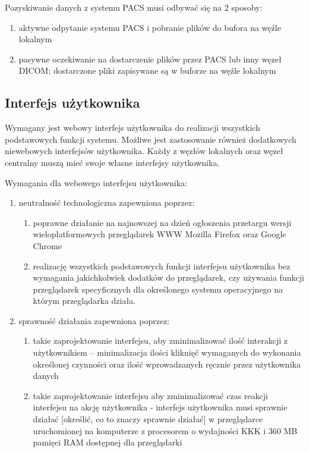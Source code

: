 \documentclass[a4paper]{article}
\begin{document}
Pozyskiwanie danych z systemu PACS musi odbywać się na 2 sposoby:
\begin{enumerate}
  \item aktywne odpytanie systemu PACS i pobranie plików do bufora na węźle lokalnym
  \item pasywne oczekiwanie na dostarczenie plików przez PACS lub inny węzeł DICOM; dostarczone pliki zapisywane są w buforze na węźle lokalnym
\end{enumerate}

\subsection{Interfejs użytkownika}

Wymagany jest webowy interfejs użytkownika do realizacji wszystkich podstawowych funkcji systemu. Możliwe jest zastosowanie również dodatkowych niewebowych interfejsów użytkownika. Każdy z węzłów lokalnych oraz węzeł centralny muszą mieć swoje własne interfejsy użytkownika.

Wymagania dla webowego interfejsu użytkownika:

\begin{enumerate}
    \item neutralność technologiczna zapewniona poprzez:
	  \begin{enumerate}
	  \item poprawne działanie na najnowszej na dzień ogłoszenia przetargu wersji wieloplatformowych przeglądarek WWW Mozilla Firefox oraz Google Chrome
	  \item realizację wszystkich podstawowych funkcji interfejsu użytkownika bez wymagania jakichkolwiek dodatków do przeglądarek, czy używania funkcji przeglądarek specyficznych dla określonego systemu operacyjnego na którym przeglądarka działa.
	  \end{enumerate}
    \item sprawność działania zapewniona poprzez:
	  \begin{enumerate}
	  \item takie zaprojektowanie interfejsu, aby zminimalizować ilość interakcji z użytkownikiem -- minimalizacja ilości kliknięć wymaganych do wykonania określonej czynności oraz ilość wprowadzanych ręcznie przez użytkownika danych
	  \item takie zaprojektowanie interfejsu aby zminimalizować czas reakcji interfejsu na akcję użytkownika - interfejs użytkownika musi sprawnie działać [określić, co to znaczy sprawnie działać] w przeglądarce uruchomionej na komputerze z procesorem o wydajności KKK i 360 MB pamięci RAM dostępnej dla przeglądarki
	  \end{enumerate}
\end{enumerate}
\end{document}
